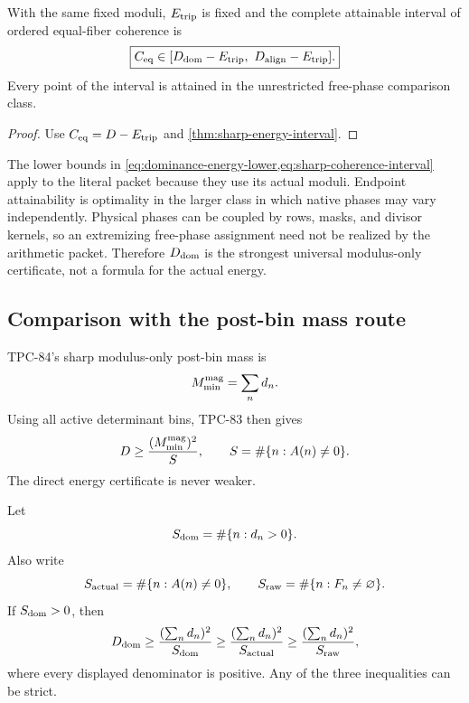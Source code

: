 \begin{corollary}
\label{cor:sharp-coherence-interval}
With the same fixed moduli, \(E_{\rm trip}\) is fixed and the complete
attainable interval of ordered equal-fiber coherence is
\begin{equation}
 \boxed{
 C_{\mathrm{eq}}\in
 [D_{\mathrm{dom}}-E_{\rm trip},\
  D_{\rm align}-E_{\rm trip}].}
\label{eq:sharp-coherence-interval}
\end{equation}
Every point of the interval is attained in the unrestricted
free-phase comparison class.
\end{corollary}

\begin{proof}
Use \(C_{\mathrm{eq}}=D-E_{\rm trip}\) and
\cref{thm:sharp-energy-interval}.
\end{proof}

\begin{remark}
\label{rem:free-phase-optimality}
The lower bounds in
\cref{eq:dominance-energy-lower,eq:sharp-coherence-interval} apply
to the literal packet because they use its actual moduli.  Endpoint
attainability is optimality in the larger class in which native phases
may vary independently.  Physical phases can be coupled by rows,
masks, and divisor kernels, so an extremizing free-phase assignment
need not be realized by the arithmetic packet.  Therefore
\(D_{\mathrm{dom}}\) is the strongest universal modulus-only certificate, not
a formula for the actual energy.
\end{remark}

\subsection{Comparison with the post-bin mass route}

TPC-84's sharp modulus-only post-bin mass is
\[
 M_{\min}^{\rm mag}=\sum_nd_n.
\]
Using all active determinant bins, TPC-83 then gives
\[
 D\ge\frac{(M_{\min}^{\rm mag})^2}{S},
 \qquad S=\#\{n:A(n)\ne0\}.
\]
The direct energy certificate is never weaker.

\begin{proposition}
\label{prop:support-refined-comparison}
Let
\[
 S_{\mathrm{dom}}=\#\{n:d_n>0\}.
\]
Also write
\[
 S_{\rm actual}=\#\{n:A(n)\ne0\},
 \qquad
 S_{\rm raw}=\#\{n:F_n\ne\varnothing\}.
\]
If \(S_{\mathrm{dom}}>0\), then
\begin{equation}
 D_{\mathrm{dom}}
 \ge
 \frac{(\sum_nd_n)^2}{S_{\mathrm{dom}}}
 \ge
 \frac{(\sum_nd_n)^2}{S_{\rm actual}}
 \ge
 \frac{(\sum_nd_n)^2}{S_{\rm raw}},
\label{eq:direct-better-global}
\end{equation}
where every displayed denominator is positive.  Any of the three
inequalities can be strict.
\end{proposition}

